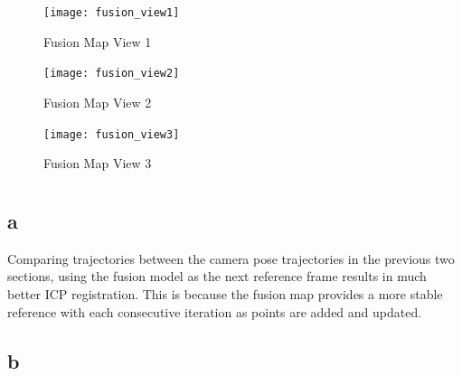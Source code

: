 \documentclass[12pt]{article}
\begin{document}
\begin{figure}[H]
\centering
\texttt{[image: fusion\_view1]}
\caption{ Fusion Map View 1 } 
\label{fig:fusion1}
\end{figure}   

\begin{figure}[H]
\centering
\texttt{[image: fusion\_view2]}
\caption{ Fusion Map View 2 } 
\label{fig:fusion2}
\end{figure}   

\begin{figure}[H]
\centering
\texttt{[image: fusion\_view3]}
\caption{ Fusion Map View 3 } 
\label{fig:fusion3}
\end{figure}   

\section{}
\subsection{a}
Comparing trajectories between the camera pose trajectories in the previous two sections, using the fusion model as the next reference frame results in much better ICP registration. This is because the fusion map provides a more stable reference with each consecutive iteration as points are added and updated.
\subsection{b}
\end{document}
